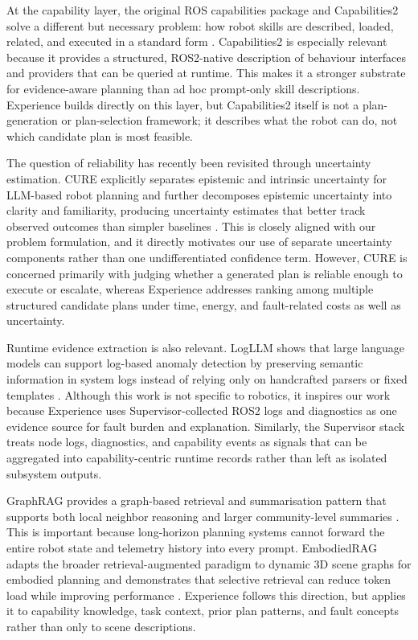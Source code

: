 \documentclass[letterpaper, 10pt, conference]{ieeeconf}
\begin{document}
At the capability layer, the original ROS capabilities package and Capabilities2 solve a different but necessary problem: how robot skills are described, loaded, related, and executed in a standard form \cite{woodall_ros_2014, pritchard_capabilities2_2025}. Capabilities2 is especially relevant because it provides a structured, ROS2-native description of behaviour interfaces and providers that can be queried at runtime. This makes it a stronger substrate for evidence-aware planning than ad hoc prompt-only skill descriptions. Experience builds directly on this layer, but Capabilities2 itself is not a plan-generation or plan-selection framework; it describes what the robot can do, not which candidate plan is most feasible.

The question of reliability has recently been revisited through uncertainty estimation. CURE explicitly separates epistemic and intrinsic uncertainty for LLM-based robot planning and further decomposes epistemic uncertainty into clarity and familiarity, producing uncertainty estimates that better track observed outcomes than simpler baselines \cite{yin2025reliablellmbasedrobotplanning}. This is closely aligned with our problem formulation, and it directly motivates our use of separate uncertainty components rather than one undifferentiated confidence term. However, CURE is concerned primarily with judging whether a generated plan is reliable enough to execute or escalate, whereas Experience addresses ranking among multiple structured candidate plans under time, energy, and fault-related costs as well as uncertainty.

Runtime evidence extraction is also relevant. LogLLM shows that large language models can support log-based anomaly detection by preserving semantic information in system logs instead of relying only on handcrafted parsers or fixed templates \cite{guan2025logllmlogbasedanomalydetection}. Although this work is not specific to robotics, it inspires our work because Experience uses Supervisor-collected ROS2 logs and diagnostics as one evidence source for fault burden and explanation. Similarly, the Supervisor stack treats node logs, diagnostics, and capability events as signals that can be aggregated into capability-centric runtime records rather than left as isolated subsystem outputs.

GraphRAG provides a graph-based retrieval and summarisation pattern that supports both local neighbor reasoning and larger community-level summaries \cite{edge2025localglobalgraphrag}. This is important because long-horizon planning systems cannot forward the entire robot state and telemetry history into every prompt. EmbodiedRAG adapts the broader retrieval-augmented paradigm to dynamic 3D scene graphs for embodied planning and demonstrates that selective retrieval can reduce token load while improving performance \cite{booker2024embodiedragdynamic3dscene}. Experience follows this direction, but applies it to capability knowledge, task context, prior plan patterns, and fault concepts rather than only to scene descriptions.
\end{document}
